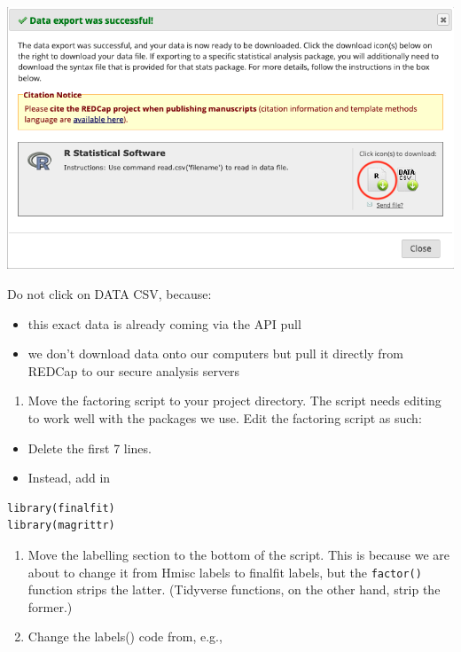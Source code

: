 \documentclass[
]{book}
\providecommand{\tightlist}{%
  \setlength{\itemsep}{0pt}\setlength{\parskip}{0pt}}
\begin{document}
\includegraphics[width=800px]{img/redcap_factoring_file}

Do not click on DATA CSV, because:

\begin{itemize}
\tightlist
\item
  this exact data is already coming via the API pull
\item
  we don't download data onto our computers but pull it directly from REDCap to our secure analysis servers
\end{itemize}

\begin{enumerate}
\def\labelenumi{\arabic{enumi}.}
\setcounter{enumi}{1}
\tightlist
\item
  Move the factoring script to your project directory. The script needs editing to work well with the packages we use. Edit the factoring script as such:
\end{enumerate}

\begin{itemize}
\tightlist
\item
  Delete the first 7 lines.
\item
  Instead, add in
\end{itemize}

\begin{verbatim}
library(finalfit)
library(magrittr)
\end{verbatim}

\begin{enumerate}
\def\labelenumi{\arabic{enumi}.}
\setcounter{enumi}{2}
\item
  Move the labelling section to the bottom of the script. This is because we are about to change it from Hmisc labels to finalfit labels, but the \texttt{factor()} function strips the latter. (Tidyverse functions, on the other hand, strip the former.)
\item
  Change the labels() code from, e.g.,
\end{enumerate}
\end{document}
